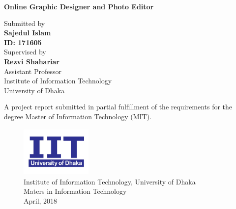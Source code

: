 \documentclass[12pt,a4 paper]{report}
\begin{document}
\thispagestyle{empty}
\mbox{}

\newpage

\begin{large}
\begin{center}
\thispagestyle{empty}
\textbf{Online Graphic Designer and Photo Editor} 
\vspace*{1cm}
\end{center}
\end{large}

\begin{center}
\vspace*{.5cm}
Submitted by \\ \vspace*{.2cm}  \textbf{Sajedul Islam} \\
\vspace*{.1cm} \textbf{ID: 171605} \\

\vspace*{1cm} 
Supervised by \\ \vspace*{.2cm}  \textbf{Rezvi Shahariar} \\ \vspace*{.1cm}Assistant Professor \\ \vspace*{.1cm}Institute of Information Technology \\ \vspace*{.1cm}University of Dhaka \\
\vspace*{1cm}

\vspace*{1.5cm}
A project report submitted in partial fulfillment of the requirements for the degree Master of Information Technology (MIT). \vspace*{.35cm}


\end{center}
\begin{figure}[h]
\begin{center}
\includegraphics[width=3.5cm, height=2.5cm]{iit.jpg}\\
\vspace{.5cm}
Institute of Information Technology, University of Dhaka  \\
Maters in Information Technology \\
\vspace{.5cm}
April, 2018\\
\end{center}
\end{figure} 
\end{document}
